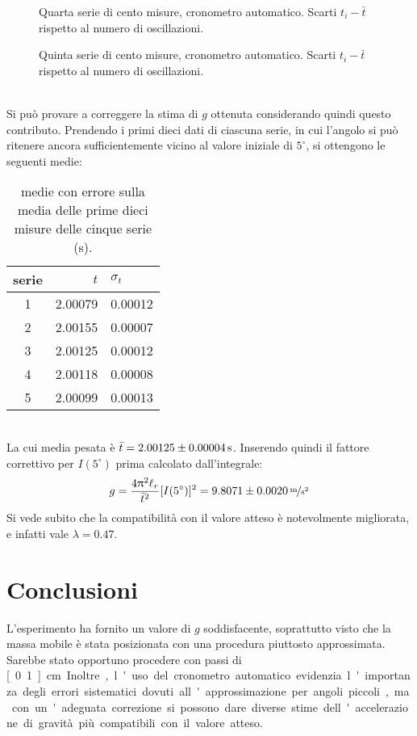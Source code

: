 \documentclass[italian,a4paper]{article}
\renewcommand{\pi}{\uppi} %
\begin{document}
\begin{figure}[hp]
\centering
\caption{Quarta serie di cento misure, cronometro automatico. Scarti $t_i - \bar{t}$ rispetto al numero di oscillazioni.}\label{scarti4}
 
\end{figure}
\begin{figure}[hp]
\centering
\caption{Quinta serie di cento misure, cronometro automatico. Scarti $t_i - \bar{t}$ rispetto al numero di oscillazioni.}\label{scarti5}
 
\end{figure}\\
Si può provare a correggere la stima di $g$ ottenuta considerando quindi questo contributo. Prendendo i primi dieci dati di ciascuna serie, in cui l'angolo si può ritenere ancora sufficientemente vicino al valore iniziale di $5^\circ$, si ottengono le seguenti medie:
\begin{table}[h]\caption{medie con errore sulla media delle prime dieci misure delle cinque serie (\unit{s}).}\label{medie2}
\centering
\begin{tabular}{cr@{$\pm$}l}
 serie & $t$&$\sigma_{t}$\\\hline
 1 & 2.00079&0.00012\\
 2 & 2.00155&0.00007\\
 3 & 2.00125&0.00012\\
 4 & 2.00118&0.00008\\
 5 & 2.00099&0.00013\\
\end{tabular}
\end{table}\\
La cui media pesata è $\bar{t}=\unit[2.00125\pm0.00004]{s}$. Inserendo quindi il fattore correttivo per $I(5^\circ)$ prima calcolato dall'integrale:
\begin{equation*}
 g=\dfrac{4\pi^2 \ell_r}{\bar{t}^2}[I(5^\circ)]^2 = \unitfrac[9.8071\pm0.0020]{m}{s^2}
\end{equation*}
Si vede subito che la compatibilità con il valore atteso è notevolmente migliorata, e infatti vale $\lambda = 0.47$.
\section{Conclusioni}
L'esperimento ha fornito un valore di $g$ soddisfacente, soprattutto visto che la massa mobile è stata posizionata con una procedura piuttosto approssimata. Sarebbe stato opportuno procedere con passi di \unit[0.1]{cm}. Inoltre, l'uso del cronometro automatico evidenzia l'importanza degli errori sistematici dovuti all'approssimazione per angoli piccoli, ma con un'adeguata correzione si possono dare diverse stime dell'accelerazione di gravità più compatibili con il valore atteso.
\end{document}
